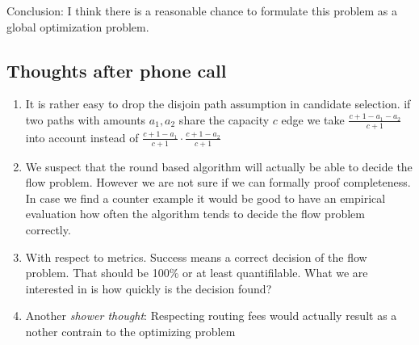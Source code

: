 \documentclass[10pt,twocolumn]{article}
\begin{document}
Conclusion: I think there is a reasonable chance to formulate this problem as a global optimization problem.
  

\subsection{Thoughts after phone call}
\begin{enumerate}
\item It is rather easy to drop the disjoin path assumption in candidate selection. if two paths with amounts $a_1,a_2$ share the capacity $c$ edge we take $\frac{c+1-a_1-a_2}{c+1}$ into account instead of $\frac{c+1-a_1}{c+1}\cdot\frac{c+1-a_2}{c+1}$
\item We suspect that the round based algorithm will actually be able to decide the flow problem. However we are not sure if we can formally proof completeness. In case we find a counter example it would be good to have an empirical evaluation how often the algorithm tends to decide the flow problem correctly.
\item With respect to metrics. Success means a correct decision of the flow problem. That should be 100\% or at least quantifilable. What we are interested in is how quickly is the decision found? 
\item Another \textit{shower thought}: Respecting routing fees would actually result as a nother contrain to the optimizing problem
\end{enumerate}





\end{document}
